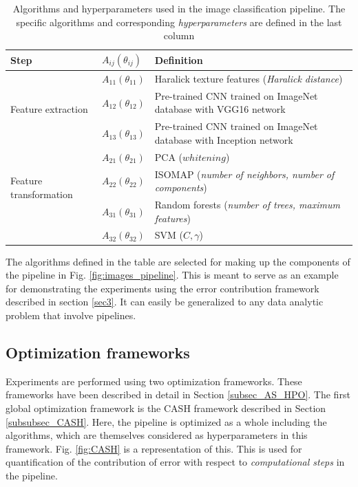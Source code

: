 \begin{table}[ht!]
\centering
\caption{Algorithms and hyperparameters used in the image classification pipeline. The specific algorithms and corresponding \textit{hyperparameters} are defined in the last column}
\begin{tabular}{@{} |m{9.7em}|m{1.5cm}|m{8cm}| @{}} 
 \hline
 Step & $A_{ij}(\theta_{ij})$ & Definition \\ 
 \hline
 \multirow{3}{*}{Feature extraction} & $A_{11}(\theta_{11})$ & Haralick texture features (\textit{Haralick distance}) \\ 
 & $A_{12}(\theta_{12})$ & Pre-trained CNN trained on ImageNet \cite{deng2009imagenet} database with VGG16 \cite{simonyan2014very} network  \\
  & $A_{13}(\theta_{13})$ & Pre-trained CNN trained on ImageNet \cite{deng2009imagenet} database with Inception \cite{szegedy2016rethinking} network  \\
 \hline
 \multirow{3}{*}{Feature transformation} & $A_{21}(\theta_{21})$ & PCA ($whitening$) \cite{wold1987principal} \\
 & $A_{22}(\theta_{22})$ & ISOMAP (\textit{number of neighbors, number of components}) \cite{tenenbaum2000global} \\
 \hline
 \multirow{3}{*}{Learning algorithms} & $A_{31}(\theta_{31})$ & Random forests (\textit{number of trees, maximum features}) \cite{breiman2001random} \\
 & $A_{32}(\theta_{32})$ & SVM ($C, \gamma$) \cite{cortes1995support}\\
 \hline
 \end{tabular}
 \label{table:algorithms_table}
\end{table}
The algorithms defined in the table are selected for making up the components of the pipeline in Fig. \ref{fig:images_pipeline}. This is meant to serve as an example for demonstrating the experiments using the error contribution framework described in section \ref{sec3}. It can easily be generalized to any data analytic problem that involve pipelines. 

\subsection{Optimization frameworks}
\label{frameworks}
Experiments are performed using two optimization frameworks. These frameworks have been described in detail in Section \ref{subsec_AS_HPO}. 
The first global optimization framework is the CASH framework described in Section \ref{subsubsec_CASH}. Here, the pipeline is optimized as a whole including the algorithms, which are themselves considered as hyperparameters in this framework.  Fig. \ref{fig:CASH} is a representation of this. This is used for quantification of the contribution of error with respect to \textit{computational steps} in the pipeline.

